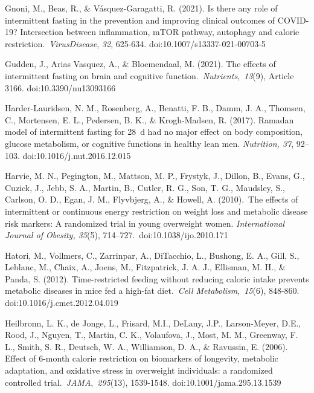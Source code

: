 \documentclass[authordate, empirical]{jote-new-article}
\begin{document}
Gnoni, M., Beas, R., \& Vásquez-Garagatti, R. (2021). Is there any role of intermittent fasting in the prevention and improving clinical outcomes of COVID-19? Intersection between inflammation, mTOR pathway, autophagy and calorie restriction. \emph{VirusDisease}, \emph{32}, 625-634. doi:10.1007/s13337-021-00703-5



Gudden, J., Arias Vasquez, A., \& Bloemendaal, M. (2021). The effects of intermittent fasting on brain and cognitive function. \emph{Nutrients}, \emph{13}(9), Article 3166. doi:10.3390/nu13093166



Harder-Lauridsen, N. M., Rosenberg, A., Benatti, F. B., Damm, J. A., Thomsen, C., Mortensen, E. L., Pedersen, B. K., \& Krogh-Madsen, R. (2017). Ramadan model of intermittent fasting for 28 d had no major effect on body composition, glucose metabolism, or cognitive functions in healthy lean men. \emph{Nutrition, 37}, 92--103. doi:10.1016/j.nut.2016.12.015



Harvie, M. N., Pegington, M., Mattson, M. P., Frystyk, J., Dillon, B., Evans, G., Cuzick, J., Jebb, S. A., Martin, B., Cutler, R. G., Son, T. G., Maudsley, S., Carlson, O. D., Egan, J. M., Flyvbjerg, A., \& Howell, A. (2010). The effects of intermittent or continuous energy restriction on weight loss and metabolic disease risk markers: A randomized trial in young overweight women.\emph{ International Journal of Obesity, 35}(5), 714--727. doi:10.1038/ijo.2010.171



Hatori, M., Vollmers, C., Zarrinpar, A., DiTacchio, L., Bushong, E. A., Gill, S., Leblanc, M., Chaix, A., Joens, M., Fitzpatrick, J. A. J., Ellisman, M. H., \& Panda, S. (2012). Time-restricted feeding without reducing caloric intake prevents metabolic diseases in mice fed a high-fat diet. \emph{Cell Metabolism}, \emph{15}(6), 848-860. doi:10.1016/j.cmet.2012.04.019



Heilbronn, L. K., de Jonge, L., Frisard, M.I., DeLany, J.P., Larson-Meyer, D.E., Rood, J., Nguyen, T., Martin, C. K., Volaufova, J., Most, M. M., Greenway, F. L., Smith, S. R., Deutsch, W. A., Williamson, D. A., \& Ravussin, E. (2006). Effect of 6-month calorie restriction on biomarkers of longevity, metabolic adaptation, and oxidative stress in overweight individuals: a randomized controlled trial. \emph{JAMA}, \emph{295}(13), 1539-1548. doi:10.1001/jama.295.13.1539
\end{document}
